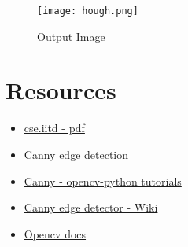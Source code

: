 \documentclass[]{article}
\providecommand{\tightlist}{%
  \setlength{\itemsep}{0pt}\setlength{\parskip}{0pt}}
\begin{document}
\begin{figure}[htbp]
\centering
\texttt{[image: hough.png]}
\caption{Output Image}
\end{figure}

\newpage
\section{Resources}\label{resources}

\begin{itemize}
\tightlist
\item
  \href{http://www.cse.iitd.ernet.in/\textasciitilde{}pkalra/csl783/canny.pdf}{cse.iitd - pdf}
\item
  \href{http://dasl.mem.drexel.edu/alumni/bGreen/www.pages.drexel.edu/\_weg22/can\_tut.html}{Canny edge detection}
\item
  \href{http://opencv-python-tutroals.readthedocs.org/en/latest/py\_tutorials/py\_imgproc/
  py\_canny/py\_canny.html}{Canny - opencv-python tutorials}
\item
  \href{http://en.wikipedia.org/wiki/Canny\_edge\_detector}{Canny edge detector - Wiki}
\item
  \href{http://docs.opencv.org/modules/imgproc/doc/feature\_detection.html}{Opencv docs}
\end{itemize}
\end{document}
